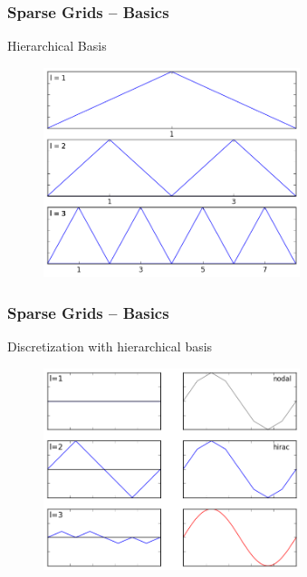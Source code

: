 \begin{frame}
  \frametitle{Sparse Grids -- Basics}
  \topline
  \vspace{-10px}
  \begin{block}{Hierarchical Basis}
    \begin{figure}[!htp]
      \centering
      \includegraphics[width=7.5cm]{images/sparse_hats}
      \vspace{-12px}
      \caption{}
    \end{figure}
  \end{block}
\end{frame}

\begin{frame}
  \frametitle{Sparse Grids -- Basics}
  \topline
  \vspace{-10px}
  \begin{block}{Discretization with hierarchical basis}
    \begin{figure}[!htp]
      \centering
      \includegraphics[width=7.5cm]{images/sparsegrid_1d_1}
      \vspace{-12px}
      \caption{}
    \end{figure}
  \end{block}
\end{frame}


